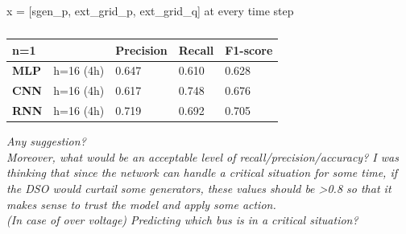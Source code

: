 x = [sgen\_p, ext\_grid\_p, ext\_grid\_q] at every time step
\begin{table}[H]
\centering
\begin{tabular}{|ll|l|l|l|}
\hline
\multicolumn{2}{|l|}{n=1} & \textbf{Precision} & \textbf{Recall} & \textbf{F1-score} \\ \hline
\multicolumn{1}{|l|}{\textbf{MLP}} & h=16 (4h) & 0.647 & 0.610 & 0.628 \\ \hline
\multicolumn{1}{|l|}{\textbf{CNN}} & h=16 (4h) & 0.617 & 0.748 & 0.676 \\ \hline
\multicolumn{1}{|l|}{\textbf{RNN}} & h=16 (4h) & 0.719 & 0.692 & 0.705 \\ \hline
\end{tabular}
\caption{}
\label{tab:5.5}
\end{table}



\noindent \emph{Any suggestion? \\ Moreover, what would be an acceptable level of recall/precision/accuracy? I was thinking that since the network can handle a critical situation for some time, if the DSO would curtail some generators, these values should be >0.8 so that it makes sense to trust the model and apply some action.} \label{q:evaluation}\\

\noindent \emph{(In case of over voltage) Predicting which bus is in a critical situation?}

    


